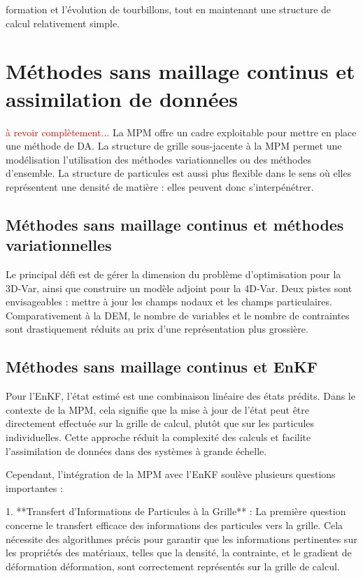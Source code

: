 formation et l'évolution de tourbillons, tout en maintenant une structure de calcul relativement simple.

\section{Méthodes sans maillage continus et assimilation de données}
\textcolor{red}{ à revoir complètement...}
La MPM offre un cadre exploitable pour mettre en place une méthode de DA.
La structure de grille sous-jacente à la MPM permet une modélisation l'utilisation des méthodes variationnelles ou des méthodes d'ensemble. La structure de particules est aussi plus flexible dans le sens où elles représentent une densité de matière : elles peuvent donc s'interpénétrer.

\subsection{Méthodes sans maillage continus et méthodes variationnelles}
Le principal défi est de gérer la dimension du problème d'optimisation pour la 3D-Var, ainsi que construire un modèle adjoint pour la 4D-Var.
Deux pistes sont envisageables : mettre à jour les champs nodaux et les champs particulaires. Comparativement à la DEM, le nombre de variables et le nombre de contraintes sont drastiquement réduits au prix d'une représentation plus grossière.

\subsection{Méthodes sans maillage continus et EnKF}
Pour l'EnKF, l'état estimé est une combinaison linéaire des états prédits. Dans le contexte de la MPM, cela signifie que la mise à jour de l'état peut être directement effectuée sur la grille de calcul, plutôt que sur les particules individuelles. Cette approche réduit la complexité des calculs et facilite l'assimilation de données dans des systèmes à grande échelle.

Cependant, l'intégration de la MPM avec l'EnKF soulève plusieurs questions importantes :

1. **Transfert d'Informations de Particules à la Grille** : La première question concerne le transfert efficace des informations des particules vers la grille. Cela nécessite des algorithmes précis pour garantir que les informations pertinentes sur les propriétés des matériaux, telles que la densité, la contrainte, et le gradient de déformation déformation, sont correctement représentés sur la grille de calcul.

